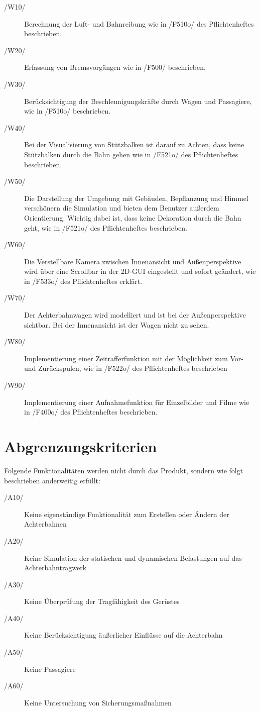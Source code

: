 \begin{description}
	\item[/W10/] Berechnung der Luft- und Bahnreibung wie in /F510o/ des Pflichtenheftes beschrieben.
	\item[/W20/] Erfassung von Bremsvorgängen wie in /F500/ beschrieben.
	\item[/W30/] Berücksichtigung der Beschleunigungskräfte durch Wagen und Passagiere, wie in /F510o/ beschrieben.
	\item[/W40/] Bei der Visualisierung von Stützbalken ist darauf zu Achten, dass keine Stützbalken durch die Bahn gehen wie in /F521o/ des Pflichtenheftes beschrieben.
	\item[/W50/] Die Darstellung der Umgebung mit Gebäuden, Bepflanzung und Himmel verschönern die Simulation und bieten dem Benutzer außerdem Orientierung. Wichtig dabei ist, dass keine Dekoration durch die Bahn geht, wie in /F521o/ des Pflichtenheftes beschrieben. 
	\item[/W60/] Die Verstellbare Kamera zwischen Innenansicht und Außenperspektive wird über eine Scrollbar in der 2D-GUI eingestellt und sofort geändert, wie in /F533o/ des Pflichtenheftes erklärt.
	\item[/W70/] Der Achterbahnwagen wird modelliert und ist bei der Außenperspektive sichtbar. Bei der Innenansicht ist der Wagen nicht zu sehen.
	\item[/W80/] Implementierung einer Zeitrafferfunktion mit der Möglichkeit zum Vor- und Zurückspulen, wie in /F522o/ des Pflichtenheftes beschrieben
	\item[/W90/] Implementierung einer Aufnahmefunktion für Einzelbilder und Filme wie in /F400o/ des Pflichtenheftes beschrieben.
\end{description}

\section{Abgrenzungskriterien}
Folgende Funktionalitäten werden nicht durch das Produkt, sondern wie folgt
beschrieben anderweitig erfüllt:
\begin{description}
	\item[/A10/] Keine eigenständige Funktionalität zum Erstellen oder Ändern der Achterbahnen
	\item[/A20/] Keine Simulation der statischen und dynamischen Belastungen auf das Achterbahntragwerk
	\item[/A30/] Keine Überprüfung der Tragfähigkeit des Gerüstes
	\item[/A40/] Keine Berücksichtigung äußerlicher Einflüsse auf die Achterbahn
	\item[/A50/] Keine Passagiere
	\item[/A60/] Keine Untersuchung von Sicherungsmaßnahmen
\end{description}
